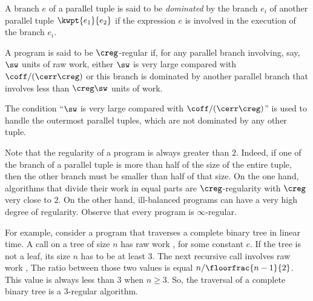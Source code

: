 \begin{definition}
A branch $e$ of a parallel tuple is said to be {\em dominated} by the
branch $e_i$ of another parallel tuple $\kwpt{e_1}{e_2}$ if
the expression $e$ is involved in the execution of the branch $e_i$.
\end{definition}

\begin{definition}
A program is said to be $\creg$-regular if,
for any parallel branch involving, say, $\sw$ units of raw work, 
either $\sw$ is very large compared with $\coff/(\cerr\creg)$
or this branch is dominated by another parallel branch
that involves less than $\creg\sw$ units of work.
\end{definition}
%
The condition ``$\sw$ is very large compared with $\coff/(\cerr\creg)$''
is used to handle the outermost parallel tuples, which are not
dominated by any other tuple. 

Note that the regularity of a program is always greater than $2$.
Indeed, if one of the branch of a parallel tuple is more
than half of the size of the entire tuple, then the other 
branch must be smaller than half of that size.
On the one hand, algorithms that divide their work in 
equal parts are $\creg$-regularity with $\creg$ very close to $2$.
On the other hand, ill-balanced programs can have a very
high degree of regularity. Observe that every program is $\infty$-regular.

For example, consider a program that traverses a complete binary tree
in linear time. A call on a tree of size $n$ 
has raw work , for some constant $c$.
If the tree is not a leaf, its size $n$ has to be at least $3$.
The next recursive call involves raw work ,
The ratio between those two values is equal $n / \floorfrac{n-1}{2}$.
This value is always less than $3$ when $n\geq 3$.
So, the traversal of a complete binary tree is a 3-regular algorithm.


